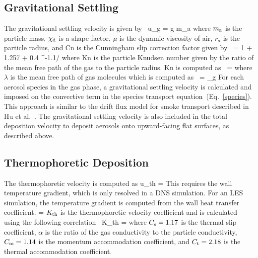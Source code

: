 \subsection{Gravitational Settling}

The gravitational settling velocity is given by~\cite{Davies_Charles}
\be
u_{\rm g} = g m_{\rm a} 
\ee
where $m_{\rm a}$ is the particle mass, $\chi_{\rm d}$ is a shape factor, $\mu$ is the dynamic viscosity of air,
$r_a$ is the particle radius, and Cn is the Cunningham slip correction factor given by~\cite{Davies_Charles}
\be
{} = 1 + 1.257 \;  + 0.4 \;  \; ^{-1.1/}
\ee
where Kn is the particle Knudsen number given by the ratio of the mean free path of the gas
to the particle radius. Kn is computed as~\cite{Sippola:1}
\be
{} = 
\ee
where $\lambda$ is the mean free path of gas molecules which is computed as~\cite{Jennings_S_G}
\be
\lambda = \mu_g \; 
\ee
For each aerosol species in the gas phase, a gravitational settling velocity is calculated
and imposed on the convective term in the species transport
equation~(Eq.~\ref{species}). This approach is similar to the drift flux model
for smoke transport described in Hu et al.~\cite{Hu:1}. The gravitational settling velocity
is also included in the total deposition velocity to deposit aerosols onto upward-facing flat surfaces,
as described above.


\subsection{Thermophoretic Deposition}

The thermophoretic velocity is computed as
\be
u_{\rm th} =  \; 
\ee
This requires the wall temperature gradient, which is only resolved in a DNS simulation.
For an LES simulation, the temperature gradient is computed from the wall heat transfer coefficient.
\be
  = 
\ee
$K_{\rm th}$ is the thermophoretic velocity coefficient and is calculated using the following correlation~\cite{Brock:1}
\be
 K_{\rm th} = 
\ee
where $C_{\rm s}=1.17$ is the thermal slip coefficient, $\alpha$ is the ratio of the gas
conductivity to the particle conductivity, $C_{\rm m}=1.14$ is the momentum accommodation
coefficient, and $C_{\rm t}=2.18$ is the thermal accommodation coefficient.

